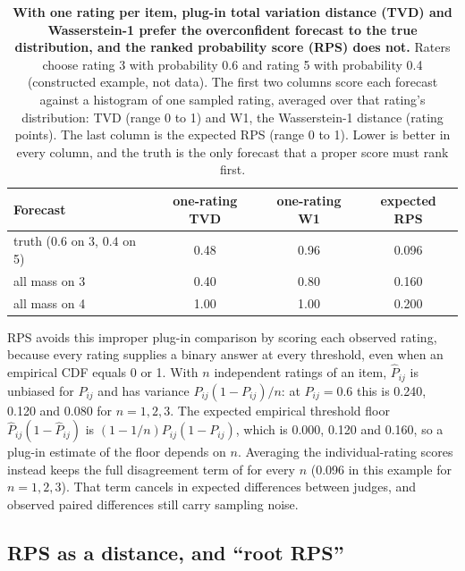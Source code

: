 \begin{table}[t]
\caption{\textbf{With one rating per item, plug-in total variation distance (TVD) and Wasserstein-1 prefer the overconfident forecast to the true distribution, and the ranked probability score (RPS) does not.}
Raters choose rating 3 with probability 0.6 and rating 5 with probability 0.4 (constructed example, not data).
The first two columns score each forecast against a histogram of one sampled rating, averaged over that rating's distribution: TVD (range 0 to 1) and W1, the Wasserstein-1 distance (rating points).
The last column is the expected RPS (range 0 to 1).
Lower is better in every column, and the truth is the only forecast that a proper score must rank first.}
\label{tab:rps-sparse}
\centering\small
\begin{tabular}{lccc}
\toprule
Forecast & one-rating TVD & one-rating W1 & expected RPS \\
\midrule
truth ($0.6$ on 3, $0.4$ on 5) & 0.48 & 0.96 & 0.096 \\
all mass on 3 & 0.40 & 0.80 & 0.160 \\
all mass on 4 & 1.00 & 1.00 & 0.200 \\
\bottomrule
\end{tabular}
\end{table}

RPS avoids this improper plug-in comparison by scoring each observed rating, because every rating supplies a binary answer at every threshold, even when an empirical CDF equals 0 or 1.
With $n$ independent ratings of an item, $\hat P_{ij}$ is unbiased for $P_{ij}$ and has variance $P_{ij}(1-P_{ij})/n$: at $P_{ij}=0.6$ this is 0.240, 0.120 and 0.080 for $n=1,2,3$.
The expected empirical threshold floor $\hat P_{ij}(1-\hat P_{ij})$ is $(1-1/n)P_{ij}(1-P_{ij})$, which is 0.000, 0.120 and 0.160, so a plug-in estimate of the floor depends on $n$.
Averaging the individual-rating scores instead keeps the full disagreement term of  for every $n$ (0.096 in this example for $n=1,2,3$).
That term cancels in expected differences between judges, and observed paired differences still carry sampling noise.

\subsection{RPS as a distance, and ``root RPS''}
\label{app:rps-distance}

